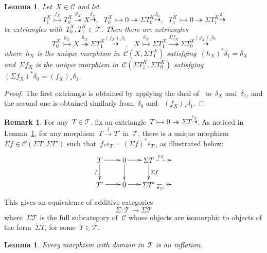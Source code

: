 \documentclass{amsart}
\newtheorem{lemma}[theorem]{Lemma}
\theoremstyle{definition}
\newtheorem{remark}[theorem]{Remark}
\newcommand{\cat}{\mathcal{C}}
\newcommand{\susp}{\Sigma}
\newcommand{\tc}{\mathcal{T}}
\newcommand{\infl}{\rightarrowtail}
\newcommand{\defl}{\twoheadrightarrow}
\newcommand{\eps}{\varepsilon}
\begin{document}
\begin{lemma}
\label{lemma::shifts of extriangles}
Let~$X\in\cat$ and let
\[
T_1^X\overset{f_X}{\infl} T_0^X\overset{g_X}{\defl} X \overset{\delta_X}{\dashrightarrow}, \ \ \ T_0^X\infl 0\defl \susp T_0^X\overset{\delta_0}{\dashrightarrow}, \ \ \ T_1^X\infl 0\defl \susp T_1^X\overset{\delta_1}{\dashrightarrow}
\]
be extriangles with~$T_0^X,T_1^X\in\tc$.
Then there are extriangles
\[
T_0^X\overset{g_X}{\infl} X \overset{h_X}{\defl} \susp T_1^X \overset{(f_X)_\ast\delta_1}{\dashrightarrow}, \ \ \ X \overset{h_X}{\infl} \susp T_1^X \overset{\susp f_X}{\defl} \susp T_0^X \overset{(g_X)_\ast\delta_0}{\dashrightarrow}
\]
where~$h_X$ is the unique morphism in~$\cat(X,\susp T_1^X)$ satisfying~$(h_X)^\ast\delta_1=\delta_X$ and~$\susp f_X$ is the unique morphism in~$\cat(\susp T_1^X,\susp T_0^X)$ satisfying~$(\susp f_X)^\ast\delta_0 = (f_X)_\ast\delta_1$.
\end{lemma}

\begin{proof}
The first extriangle is obtained by applying the dual of~\cite[Proposition 3.15]{NakaokaPalu} to~$\delta_X$ and~$\delta_1$, and the second one is obtained similarly from~$\delta_0$ and ~$(f_X)_\ast \delta_1$.
\end{proof}

\begin{remark}
\label{remark::equivalence Sigma}
For any~$T\in\tc$, fix an extriangle~$T\infl 0\defl\susp T\overset{\eps_T}{\dashrightarrow}$.
As noticed in Lemma~\ref{lemma::shifts of extriangles}, for any morphism~$T\overset{f}{\to}T'$ in~$\tc$, there is a unique morphism~$\susp f\in\cat(\susp T,\susp T')$ such that~$f_\ast\eps_T=(\susp f)^\ast\eps_{T'}$, as illustrated below:
\[
\xy
(-12,6)*+{T}="0";
(0,6)*+{0}="2";
(12,6)*+{\susp T}="4";
(24,6)*+{}="6";
%
(-12,-6)*+{T'}="10";
(0,-6)*+{0}="12";
(12,-6)*+{\susp T'}="14";
(24,-6)*+{}="16";
%
{\ar "0";"2"};
{\ar "2";"4"};
{\ar@{-->}^{\eps_T} "4";"6"};
%
{\ar_{f} "0";"10"};
{\ar "2";"12"};
{\ar^{\susp f} "4";"14"};
%
{\ar "10";"12"};
{\ar "12";"14"};
{\ar@{-->}_{\eps_{T'}} "14";"16"};
\endxy
\]
This gives an equivalence of additive categories
\[
 \susp: \tc \to \susp\tc
\]
where~$\susp\tc$ is the full subcategory of~$\cat$ whose objects are isomorphic to objects of the form~$\susp T$, for some~$T\in\tc$.
\end{remark}

\begin{lemma}
\label{lemma:: mphs in T are inflations}
Every morphism with domain in~$\tc$ is an inflation.
\end{lemma}
\end{document}
